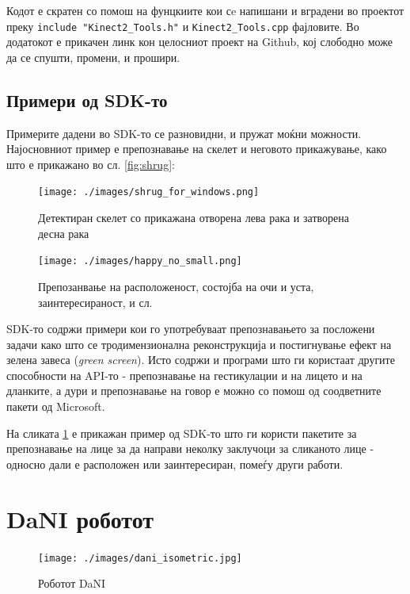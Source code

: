\documentclass[11pt]{article}
\begin{document}
    Кодот е скратен со помош на фунцкиите кои сe напишани и вградени во проектот преку \verb+include "Kinect2_Tools.h"+ и \verb+Kinect2_Tools.cpp+ фајловите. Во додатокот е прикачен линк кон целосниот проект на Github, кој слободно може да се спушти, промени, и прошири.

  \subsection{Примери од SDK-то}
     Примерите дадени во SDK-то се разновидни, и пружат моќни можности. Најосновниот пример е препознавање на скелет и неговото прикажување, како што е прикажано во сл. \ref{fig:shrug}:
     \begin{figure}[h]
      \begin{minipage}{0.562\linewidth}
        \centering
        \texttt{[image: ./images/shrug\_for\_windows.png]}
        \label{fig:shrug}
        \caption{Детектиран скелет со прикажана отворена лева рака и затворена десна рака}
      \end{minipage}
      \begin{minipage}{0.4\linewidth}
        \centering
        \texttt{[image: ./images/happy\_no\_small.png]}
        \caption{Препозанвање на расположеност, состојба на очи и уста, заинтересираност, и сл.}
        \label{fig:happy_no}
      \end{minipage}
    \end{figure}


    SDK-то содржи примери кои го употребуваат препознавањето за посложени задачи како што се тродимензионална реконструкција и постигнување ефект на зелена завеса (\textit{green screen}). Исто содржи и програми што ги користаат другите способности на API-то - препознавање на гестикулации и на лицето и на дланките, а дури и препознавање на говор е можно со помош од соодветните пакети од Microsoft.

    На сликата \ref{fig:happy_no} е прикажан пример од SDK-то што ги користи пакетите за препознавање на лице за да направи неколку заклучоци за сликаното лице - односно дали е расположен или заинтересиран, помеѓу други работи.

    \bigbreak

\newpage
\section{DaNI роботот}
  \begin{figure}[H]
    \texttt{[image: ./images/dani\_isometric.jpg]}
    \centering
    \caption{Роботот DaNI}
    \label{fig:dani_isometric}
    \end{figure}
\end{document}
